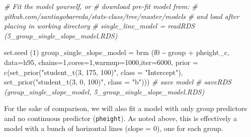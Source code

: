 \documentclass[
]{book}
\newenvironment{Shaded}{\begin{snugshade}}{\end{snugshade}}
\newcommand{\AttributeTok}[1]{\textcolor[rgb]{0.77,0.63,0.00}{#1}}
\newcommand{\CommentTok}[1]{\textcolor[rgb]{0.56,0.35,0.01}{\textit{#1}}}
\newcommand{\DecValTok}[1]{\textcolor[rgb]{0.00,0.00,0.81}{#1}}
\newcommand{\FunctionTok}[1]{\textcolor[rgb]{0.00,0.00,0.00}{#1}}
\newcommand{\NormalTok}[1]{#1}
\newcommand{\OtherTok}[1]{\textcolor[rgb]{0.56,0.35,0.01}{#1}}
\newcommand{\SpecialCharTok}[1]{\textcolor[rgb]{0.00,0.00,0.00}{#1}}
\newcommand{\StringTok}[1]{\textcolor[rgb]{0.31,0.60,0.02}{#1}}
\begin{document}
\begin{Shaded}
\begin{Highlighting}[]
\CommentTok{\# Fit the model yourself, or}
\CommentTok{\# download pre{-}fit model from: }
\CommentTok{\# github.com/santiagobarreda/stats{-}class/tree/master/models}
\CommentTok{\# and load after placing in working directory}
\CommentTok{\# single\_line\_model = readRDS (\textquotesingle{}5\_group\_single\_slope\_model.RDS\textquotesingle{})}

\FunctionTok{set.seed}\NormalTok{ (}\DecValTok{1}\NormalTok{)}
\NormalTok{group\_single\_slope\_model }\OtherTok{=}
  \FunctionTok{brm}\NormalTok{ (f0 }\SpecialCharTok{\textasciitilde{}}\NormalTok{ group }\SpecialCharTok{+}\NormalTok{ pheight\_c, }
       \AttributeTok{data=}\NormalTok{h95, }\AttributeTok{chains=}\DecValTok{1}\NormalTok{,}\AttributeTok{cores=}\DecValTok{1}\NormalTok{,}\AttributeTok{warmup=}\DecValTok{1000}\NormalTok{,}\AttributeTok{iter=}\DecValTok{6000}\NormalTok{,}
       \AttributeTok{prior =} \FunctionTok{c}\NormalTok{(}\FunctionTok{set\_prior}\NormalTok{(}\StringTok{"student\_t(3, 175, 100)"}\NormalTok{, }\AttributeTok{class =} \StringTok{"Intercept"}\NormalTok{),}
                 \FunctionTok{set\_prior}\NormalTok{(}\StringTok{"student\_t(3, 0, 100)"}\NormalTok{, }\AttributeTok{class =} \StringTok{"b"}\NormalTok{)))}
\CommentTok{\# save model}
\CommentTok{\# saveRDS (group\_single\_slope\_model, \textquotesingle{}5\_group\_single\_slope\_model.RDS\textquotesingle{})}
\end{Highlighting}
\end{Shaded}

For the sake of comparison, we will also fit a model with only group predictors and no continuous predictor (\texttt{pheight}). As noted above, this is effectively a model with a bunch of horizontal lines (slope = 0), one for each group.
\end{document}

